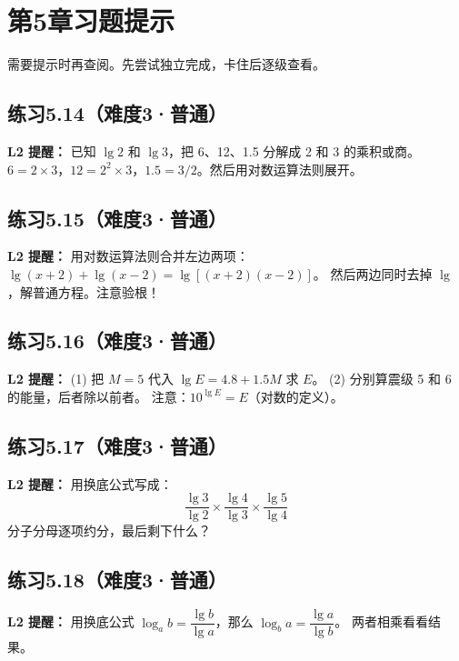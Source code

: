 \section{第5章习题提示}

需要提示时再查阅。先尝试独立完成，卡住后逐级查看。

\subsection*{练习5.14（难度3·普通）}

\textbf{L2 提醒：} 已知 \(\lg 2\) 和 \(\lg 3\)，把 6、12、1.5 分解成 2 和 3 的乘积或商。
\(6 = 2 \times 3\)，\(12 = 2^2 \times 3\)，\(1.5 = 3/2\)。然后用对数运算法则展开。

\subsection*{练习5.15（难度3·普通）}

\textbf{L2 提醒：}
用对数运算法则合并左边两项：\(\lg(x+2) + \lg(x-2) = \lg[(x+2)(x-2)]\)。
然后两边同时去掉 \(\lg\)，解普通方程。注意验根！

\subsection*{练习5.16（难度3·普通）}

\textbf{L2 提醒：}
(1) 把 \(M=5\) 代入 \(\lg E = 4.8 + 1.5M\) 求 \(E\)。
(2) 分别算震级 5 和 6 的能量，后者除以前者。
注意：\(10^{\lg E} = E\)（对数的定义）。

\subsection*{练习5.17（难度3·普通）}

\textbf{L2 提醒：}
用换底公式写成：
\[
\frac{\lg 3}{\lg 2} \times \frac{\lg 4}{\lg 3} \times \frac{\lg 5}{\lg 4}
\]
分子分母逐项约分，最后剩下什么？

\subsection*{练习5.18（难度3·普通）}

\textbf{L2 提醒：}
用换底公式 \(\log_a b = \dfrac{\lg b}{\lg a}\)，那么 \(\log_b a = \dfrac{\lg a}{\lg b}\)。
两者相乘看看结果。

